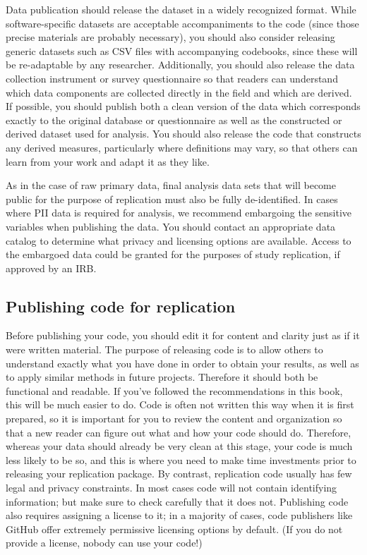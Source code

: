 Data publication should release the dataset in a widely recognized format.
While software-specific datasets are acceptable accompaniments to the code
(since those precise materials are probably necessary),
you should also consider releasing generic datasets
such as CSV files with accompanying codebooks,
since these will be re-adaptable by any researcher.
Additionally, you should also release
the data collection instrument or survey questionnaire
so that readers can understand which data components are
collected directly in the field and which are derived.
If possible, you should publish both a clean version of the data
which corresponds exactly to the original database or questionnaire
as well as the constructed or derived dataset used for analysis.
You should also release the code
that constructs any derived measures,
particularly where definitions may vary,
so that others can learn from your work and adapt it as they like.

As in the case of raw primary data,
final analysis data sets that will become public for the purpose of replication
must also be fully de-identified.
In cases where PII data is required for analysis,
we recommend embargoing the sensitive variables when publishing the data.
You should contact an appropriate data catalog
to determine what privacy and licensing options are available.
Access to the embargoed data could be granted for the purposes of study replication,
if approved by an IRB.

\subsection{Publishing code for replication}

Before publishing your code, you should edit it for content and clarity
just as if it were written material.
The purpose of releasing code is to allow others to understand
exactly what you have done in order to obtain your results,
as well as to apply similar methods in future projects.
Therefore it should both be functional and readable.
If you've followed the recommendations in this book,
this will be much easier to do.
Code is often not written this way when it is first prepared,
so it is important for you to review the content and organization
so that a new reader can figure out what and how your code should do.
Therefore, whereas your data should already be very clean at this stage,
your code is much less likely to be so, and this is where you need to make
time investments prior to releasing your replication package.
By contrast, replication code usually has few legal and privacy constraints.
In most cases code will not contain identifying information;
but make sure to check carefully that it does not.
Publishing code also requires assigning a license to it;
in a majority of cases, code publishers like GitHub
offer extremely permissive licensing options by default.
(If you do not provide a license, nobody can use your code!)

